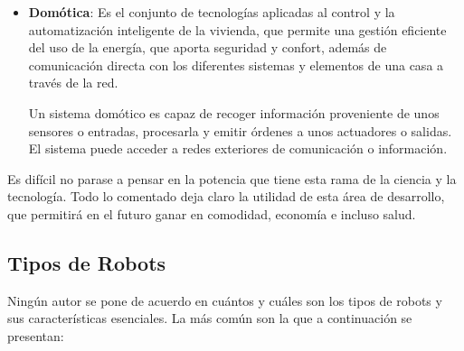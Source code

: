 \begin{itemize}
\item \textbf{Domótica}: Es el conjunto de tecnologías aplicadas al control y la automatización inteligente de la vivienda, que permite una gestión eficiente del uso de la energía, que aporta seguridad y confort, además de comunicación directa con los diferentes sistemas y elementos de una casa a través de la red.

Un sistema domótico es capaz de recoger información proveniente de unos sensores o entradas, procesarla y emitir órdenes a unos actuadores o salidas. El sistema puede acceder a redes exteriores de comunicación o información.
\end{itemize}

Es difícil no parase a pensar en la potencia que tiene esta rama de la ciencia y la
tecnología. Todo lo comentado deja claro la utilidad de esta área de desarrollo, que permitirá en el futuro ganar en comodidad, economía e incluso salud.

\subsection{Tipos de Robots}
\label{subsec:tipos de robots}

Ningún autor se pone de acuerdo en cuántos y cuáles son los tipos de robots y sus características esenciales. La más común son la que a continuación se presentan:

